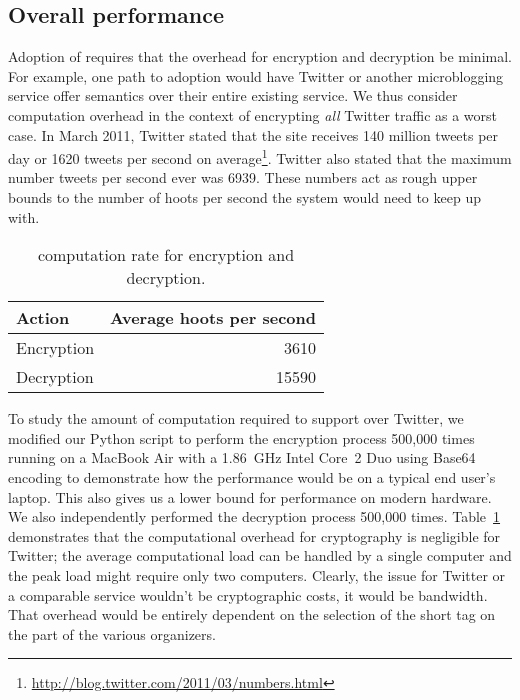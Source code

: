 \subsection{Overall \hoot performance}

Adoption of \hoot requires that the overhead for encryption and
decryption be minimal. For example, one path to adoption would have
Twitter or another microblogging service offer \hoot semantics over
their entire existing service. We thus consider computation overhead in
the context of encrypting {\em all} Twitter traffic as a worst case. In
March 2011, Twitter stated that the site receives 140 million tweets per
day or 1620 tweets per second on
average\footnote{\url{http://blog.twitter.com/2011/03/numbers.html}}. Twitter
also stated that the maximum number tweets per second ever was
6939. These numbers act as rough upper bounds to the number of hoots per
second the system would need to keep up with.

\begin{table}
\caption{\hoot computation rate for encryption and
  decryption.\label{tab:hps}}
\begin{center}
    \begin{tabular}{ l  r }
	Action & Average hoots per second \\ \hline
	Encryption & 3610 \\
	Decryption & 15590 
    \end{tabular}
\end{center}
\end{table}

To study the amount of computation required to support \hoot over
Twitter, we modified our Python script to perform the encryption process
500,000 times running on a MacBook Air with a 1.86~GHz Intel Core~2 Duo
using Base64 encoding to demonstrate how the performance would be on a
typical end user's laptop. This also gives us a lower bound for
performance on modern hardware. We also independently performed the
decryption process 500,000 times.  Table~\ref{tab:hps} demonstrates that
the computational overhead for \hoot cryptography is negligible for
Twitter; the average computational load can be handled by a single
computer and the peak load might require only two computers. Clearly,
the issue for Twitter or a comparable service wouldn't be cryptographic
costs, it would be bandwidth. That overhead would be entirely dependent
on the selection of the short tag on the part of the various \hoot
organizers.

